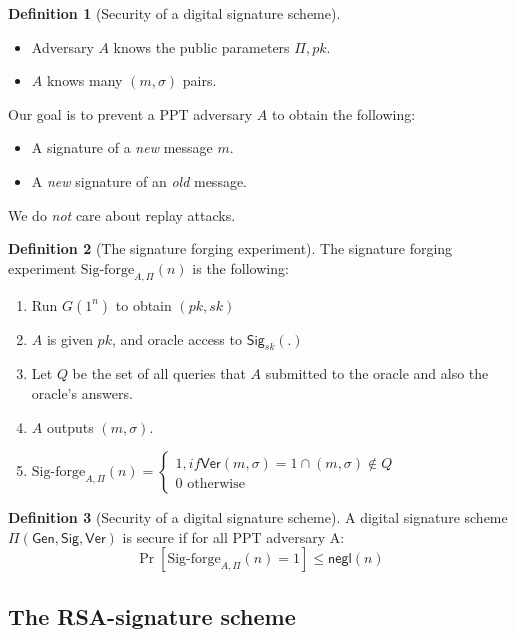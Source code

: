 \documentclass[11pt]{article}
\theoremstyle{definition}
\newtheorem{definition}{Definition}[section]
\theoremstyle{proof}
\newcommand{\Gen}{\mathsf{Gen}}
\newcommand{\Sig}{\mathsf{Sig}}
\newcommand{\Ver}{\mathsf{Ver}}
\newcommand{\negl}{\mathsf{negl}}
\begin{document}
	\begin{definition}[Security of a digital signature scheme]
		\leavevmode
		\begin{itemize}
			\item Adversary $A$ knows the public parameters $\Pi, pk$.
			\item $A$ knows many $(m, \sigma)$ pairs.
		\end{itemize}
		Our goal is to prevent a PPT adversary $A$ to obtain the following:
		\begin{itemize}
			\item A signature of a \emph{new} message $m$.
			\item A \emph{new} signature of an \emph{old} message.
		\end{itemize}
		We do \emph{not} care about replay attacks.
	\end{definition}
	
	\begin{definition}[The signature forging experiment]
		The signature forging experiment $\text{Sig-forge}_{A, \Pi}(n)$ is the following:
		\begin{enumerate}
			\item Run $G(1^n)$ to obtain $(pk, sk)$
			\item $A$ is given $pk$, and oracle access to $\Sig_{sk}(.)$
			\item Let $Q$ be the set of all queries that $A$ submitted to the oracle and also the oracle's answers.
			\item $A$ outputs $(m, \sigma)$.
			\item $\text{Sig-forge}_{A, \Pi}(n) =
			\begin{cases}
				1, if \Ver(m, \sigma) = 1 \cap (m, \sigma) \not \in Q \\
				0 \text{ otherwise}
			\end{cases}$
		\end{enumerate}
	\end{definition}
	
	\begin{definition}[Security of a digital signature scheme]
		A digital signature scheme $\Pi(\Gen, \Sig, \Ver)$ is secure if for all PPT adversary A:
		$$
		\Pr[\text{Sig-forge}_{A, \Pi}(n) = 1] \le \negl(n)
		$$
	\end{definition}
	
	\subsection{The RSA-signature scheme}
	
\end{document}

